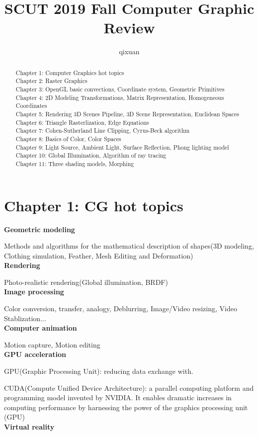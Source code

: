 \documentclass[]{report}
\title{SCUT 2019 Fall Computer Graphic Review}
\author{qixuan}
\begin{document}
\maketitle

\begin{abstract}
	Chapter 1: Computer Graphics hot topics\\
	Chapter 2: Raster Graphics\\
	Chapter 3: OpenGL basic convections, Coordinate system, Geometric Primitives\\
	Chapter 4: 2D Modeling Transformations, Matrix Representation, Homogeneous Coordinates\\
	Chapter 5: Rendering 3D Scenes Pipeline, 3D Scene Representation, Euclidean Spaces\\
	Chapter 6: Triangle Rasterlization, Edge Equations\\
	Chapter 7: Cohen-Sutherland Line Clipping, Cyrus-Beck algorithm\\
	Chapter 8: Basics of Color, Color Spaces\\
	Chapter 9: Light Source, Ambient Light, Surface Reflection, Phong lighting model\\
	Chapter 10: Global Illumination, Algorithm of ray tracing\\
	Chapter 11: Three shading models, Morphing
\end{abstract}

\section*{Chapter 1: CG hot topics}
\textbf{Geometric modeling}

Methods and algorithms for the mathematical description of shapes(3D modeling, Clothing simulation, Feather, Mesh Editing and Deformation)\\
\textbf{Rendering}

Photo-realistic rendering(Global illumination, BRDF)\\
\textbf{Image processing}

Color conversion, transfer, analogy, Deblurring, Image/Video resizing, Video Stablization...\\
\textbf{Computer animation}

Motion capture, Motion editing\\
\textbf{GPU acceleration}

GPU(Graphic Processing Unit): reducing data exchange with.

CUDA(Compute Unified Device Architecture): a parallel
computing platform and programming model invented by
NVIDIA. It enables dramatic increases in computing
performance by harnessing the power of the graphics
processing unit (GPU)\\
\textbf{Virtual reality}
\end{document}
